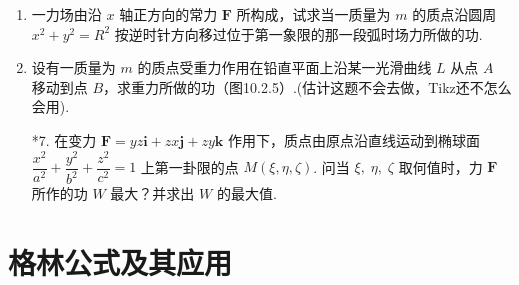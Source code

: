 \begin{enumerate}
    \item 一力场由沿 $x$ 轴正方向的常力 $\boldsymbol{F}$ 所构成，试求当一质量为 $m$ 的质点沿圆周 $x^2+y^2=R^2$ 按逆时针方向移过位于第一象限的那一段弧时场力所做的功.
    
    \item 设有一质量为 $m$ 的质点受重力作用在铅直平面上沿某一光滑曲线 $L$ 从点 $A$ 移动到点 $B$，求重力所做的功（图10.2.5）.(估计这题不会去做，Tikz还不怎么会用).
    
    \item[*7.] 在变力 $\boldsymbol{F}=yz\boldsymbol{i}+zx\boldsymbol{j}+zy\boldsymbol{k}$ 作用下，质点由原点沿直线运动到椭球面 $\dfrac{x^2}{a^2}+\dfrac{y^2}{b^2}+\dfrac{z^2}{c^2}=1$ 上第一卦限的点 $M(\xi, \eta, \zeta)$. 
    问当 $\xi,\;\eta,\;\zeta$ 取何值时，力 $\boldsymbol{F}$ 所作的功 $W$ 最大？并求出 $W$ 的最大值.
\end{enumerate}

\section{格林公式及其应用}

